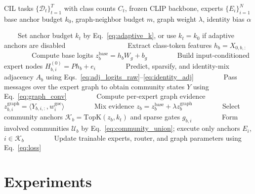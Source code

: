 \documentclass{article}
\theoremstyle{definition}
\theoremstyle{remark}
\begin{document}
\begin{algorithm}[H]
\caption{MoCE Training with Flexible Expert-Community Routing}
\label{alg:moce_training}
\begin{algorithmic}[1]
\Require CIL tasks $\{\mathcal{D}_t\}_{t=1}^{T}$ with class counts $C_t$, frozen CLIP backbone, experts $\{E_i\}_{i=1}^{N}$
\Require base anchor budget $k_0$, graph-neighbor budget $m$, graph weight $\lambda$, identity bias $\alpha$

    \State Set anchor budget $k_t$ by Eq.~\eqref{eq:adaptive_k}, or use $k_t=k_0$ if adaptive anchors are disabled
    
        \State Extract class-token features $h_b=X_{0,b,:}$
        \State Compute base logits $z^{\mathrm{base}}_b=h_bW_g+b_g$
        \State Build input-conditioned expert nodes $H^{(0)}_{b,i}=Ph_b+e_i$
        \State Predict, sparsify, and identity-mix adjacency $A_b$ using Eqs.~\eqref{eq:adj_logits_raw}--\eqref{eq:identity_adj}
        \State Pass messages over the expert graph to obtain community states $Y$ using Eq.~\eqref{eq:graph_conv}
        \State Compute per-expert graph evidence $z^{\mathrm{graph}}_{b,i}=\langle Y_{b,i,:},w_i^{\mathrm{goe}}\rangle$
        \State Mix evidence $z_b=z^{\mathrm{base}}_b+\lambda z^{\mathrm{graph}}_b$
        \State Select community anchors $\mathcal{K}_b=\mathrm{TopK}(z_b,k_t)$ and sparse gates $g_{b,i}$
        \State Form involved communities $\mathcal{U}_b$ by Eq.~\eqref{eq:community_union}; execute only anchors $E_i$, $i\in\mathcal{K}_b$
        \State Update trainable experts, router, and graph parameters using Eq.~\eqref{eq:loss}
    \EndFor
\EndFor
\end{algorithmic}
\end{algorithm}


\section{Experiments}
\end{document}

